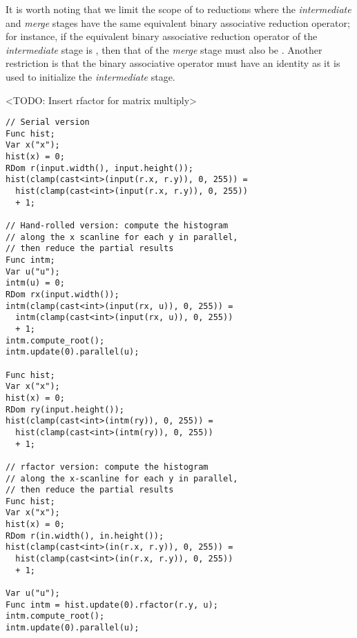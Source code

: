 It is worth noting that we limit the scope of  to reductions where the \emph{intermediate} and \emph{merge} stages have the same equivalent binary associative reduction operator; for instance, if the equivalent binary associative reduction operator of the \emph{intermediate} stage is , then that of the \emph{merge} stage must also be . Another restriction is that the binary associative operator must have an identity as it is used to initialize the \emph{intermediate} stage.

<TODO: Insert rfactor for matrix multiply> \\

\begin{lstlisting}[caption={Histogram of a two-dimensional image: serial vs. parallel hand-rolled vs. parallel rfactor}, label={lst:histogram_rfactor}]
// Serial version
Func hist;
Var x("x");
hist(x) = 0;
RDom r(input.width(), input.height());
hist(clamp(cast<int>(input(r.x, r.y)), 0, 255)) =
  hist(clamp(cast<int>(input(r.x, r.y)), 0, 255))
  + 1;

// Hand-rolled version: compute the histogram 
// along the x scanline for each y in parallel, 
// then reduce the partial results
Func intm;
Var u("u");
intm(u) = 0;
RDom rx(input.width());
intm(clamp(cast<int>(input(rx, u)), 0, 255)) =
  intm(clamp(cast<int>(input(rx, u)), 0, 255))
  + 1;
intm.compute_root();
intm.update(0).parallel(u);

Func hist;
Var x("x");
hist(x) = 0;
RDom ry(input.height());
hist(clamp(cast<int>(intm(ry)), 0, 255)) =
  hist(clamp(cast<int>(intm(ry)), 0, 255))
  + 1;

// rfactor version: compute the histogram 
// along the x-scanline for each y in parallel, 
// then reduce the partial results
Func hist;
Var x("x");
hist(x) = 0;
RDom r(in.width(), in.height());
hist(clamp(cast<int>(in(r.x, r.y)), 0, 255)) =
  hist(clamp(cast<int>(in(r.x, r.y)), 0, 255))
  + 1;

Var u("u");
Func intm = hist.update(0).rfactor(r.y, u);
intm.compute_root();
intm.update(0).parallel(u);
\end{lstlisting}

